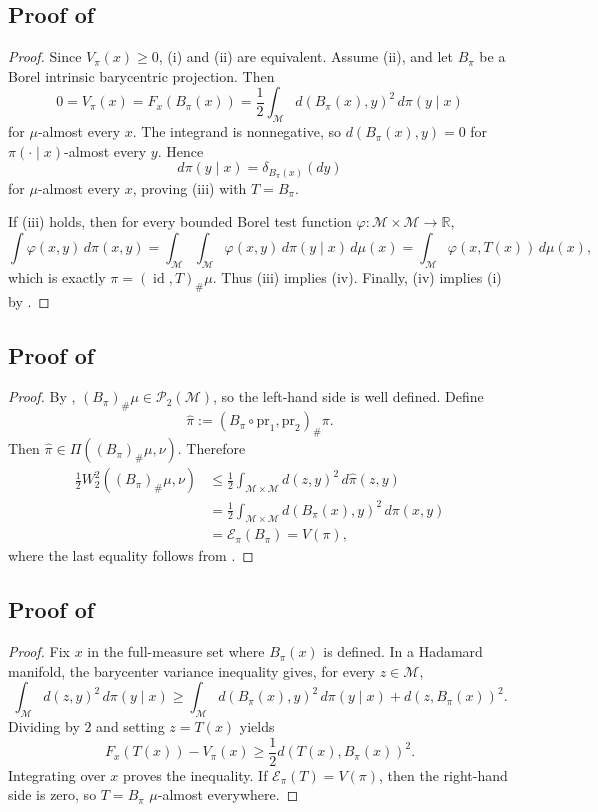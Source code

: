 \documentclass[10pt]{article} %
\theoremstyle{definition}
\providecommand{\R}{\mathbb{R}}
\providecommand{\1}{\mathbf{1}}
\providecommand{\sM}{\mathcal{M}}
\DeclareMathOperator{\id}{id}
\begin{document}
\subsection{Proof of }
\begin{proof}
Since $V_\pi(x)\ge 0$, (i) and (ii) are equivalent. Assume (ii), and let $B_\pi$ be a Borel intrinsic barycentric projection. Then
\[
0=V_\pi(x)=F_x(B_\pi(x))
=\frac12\int_{\sM} d(B_\pi(x),y)^2\,d\pi(y\mid x)
\]
for $\mu$-almost every $x$. The integrand is nonnegative, so $d(B_\pi(x),y)=0$ for $\pi(\cdot\mid x)$-almost every $y$. Hence
\[
d\pi(y\mid x)=\delta_{B_\pi(x)}(dy)
\]
for $\mu$-almost every $x$, proving (iii) with $T=B_\pi$.

If (iii) holds, then for every bounded Borel test function $\varphi:\sM\times\sM\to\R$,
\[
\int\varphi(x,y)\,d\pi(x,y)
=\int_{\sM}\int_{\sM}\varphi(x,y)\,d\pi(y\mid x)\,d\mu(x)
=\int_{\sM}\varphi(x,T(x))\,d\mu(x),
\]
which is exactly $\pi=(\id,T)_\#\mu$. Thus (iii) implies (iv). Finally, (iv) implies (i) by .
\end{proof}


\subsection{Proof of }
\begin{proof}
By , $(B_\pi)_\#\mu\in\mathcal P_2(\sM)$, so the left-hand side is well defined. Define
\[
\widehat\pi:=(B_\pi\circ\mathrm{pr}_1,\mathrm{pr}_2)_\#\pi.
\]
Then $\widehat\pi\in\Pi((B_\pi)_\#\mu,\nu)$. Therefore
\begin{align*}
\frac12 W_2^2((B_\pi)_\#\mu,\nu)
&\le \frac12\int_{\sM\times\sM}d(z,y)^2\,d\widehat\pi(z,y)\\
&=\frac12\int_{\sM\times\sM}d(B_\pi(x),y)^2\,d\pi(x,y)\\
&=\mathcal E_\pi(B_\pi)=V(\pi),
\end{align*}
where the last equality follows from .
\end{proof}



\subsection{Proof of }
\begin{proof}
Fix $x$ in the full-measure set where $B_\pi(x)$ is defined. In a Hadamard manifold, the barycenter variance inequality gives, for every $z\in\sM$,
\[
\int_{\sM} d(z,y)^2\,d\pi(y\mid x)
\ge
\int_{\sM} d(B_\pi(x),y)^2\,d\pi(y\mid x)
+d(z,B_\pi(x))^2.
\]
Dividing by $2$ and setting $z=T(x)$ yields
\[
F_x(T(x))-V_\pi(x)
\ge
\frac12 d(T(x),B_\pi(x))^2.
\]
Integrating over $x$ proves the inequality. If $\mathcal E_\pi(T)=V(\pi)$, then the right-hand side is zero, so $T=B_\pi$ $\mu$-almost everywhere.
\end{proof}
\end{document}
